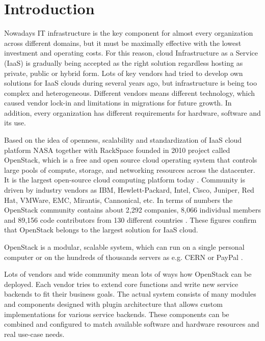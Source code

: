 
\section{Introduction}


Nowadays IT infrastructure is the key component for almost every organization across different domains, but it must be maximally effective with the lowest investment and operating costs.
For this reason, cloud Infrastructure as a Service (IaaS) is gradually being accepted as the right solution regardless hosting as private, public or hybrid form. Lots of key vendors had tried to develop own solutions for IaaS clouds during several years ago,
but infrastructure is being too complex and heterogeneous. Different vendors means different technology, which caused vendor lock-in and limitations in migrations for future growth. In addition, every organization has different requirements for hardware, software and its use. 

Based on the idea of openness, scalability and standardization of IaaS cloud platform NASA together with RackSpace founded in 2010 project called OpenStack, which is a free and open source cloud operating system that controls large pools of compute, storage, and networking resources across the
datacenter. It is the largest open-source cloud computing platform today \cite{OpenStack}. Community is driven by industry vendors as IBM, Hewlett-Packard, Intel, Cisco, Juniper, Red Hat, VMWare, EMC, Mirantis, Cannonical, etc. In terms of numbers the OpenStack community contains about 2,292 companies, 8,066 individual members and 89,156 code contributors from 130 different countries \cite{STACKALYTICS}.
These figures confirm that OpenStack belongs to the largest solution for IaaS cloud.

OpenStack is a modular, scalable system, which can run on a single personal computer or on the hundreds of thousands servers as e.g. CERN \cite{CERN} or PayPal \cite{PayPal}.

Lots of vendors and wide community mean lots of ways how OpenStack can be deployed.
Each vendor tries to extend core functions and write new service backends to fit their business goals. The actual system consists of many modules and components designed with plugin architecture that allows custom implementations for various service backends. These components can be combined and configured to match available software and hardware resources and real use-case needs.

